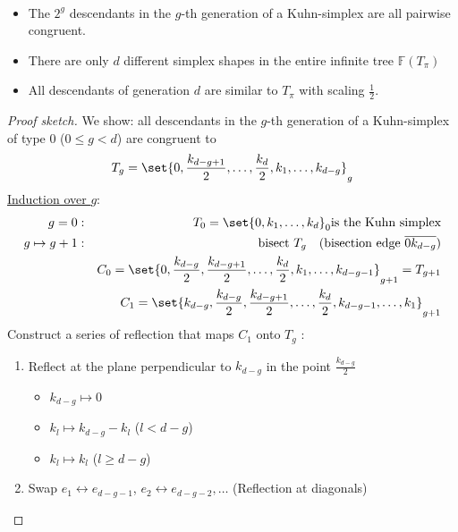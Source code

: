 \begin{theorem}\
	\begin{itemize}
		\item The $2^g$ descendants in the $g$-th generation of a Kuhn-simplex are all pairwise congruent.
		\item There are only $d$ different simplex shapes in the entire infinite tree $\mathbb{F}(T_{\pi})$
		\item All descendants of generation $d$ are similar to $T_{\pi}$ with scaling $\frac{1}{2}$.
			
	\end{itemize}
\end{theorem}
\begin{proof}[Proof sketch]
	We show: all descendants in the $g$-th generation of a Kuhn-simplex of type $0$ ($0 \leq g < d$) are congruent to
	\begin{equation*}
    T_{g}= \set{0, \frac{k_{d-g+1}}{2},\dots ,\frac{k_{d}}{2},k_{1},\dots ,k_{d-g} }_{g}
	\end{equation*}
	\underline{Induction over $g$}:
	\begin{align*}
		g=0&: & T_{0}= \set{0,k_{1},\dots ,k_{d} }_{0} \text{is the Kuhn simplex}\\
		g\mapsto g+1&: &\text{bisect } T_{g}\quad ( \text{bisection edge } \overline{0k_{d-g}})\\
		 && C_{0}= \set{ 0, \frac{k_{d-g}}{2},\frac{k_{d-g+1}}{2},\dots , \frac{k_{d}}{2},k_{1},\dots ,k_{d-g-1}}_{g+1}= T_{g+1}\\
     && C_{1}= \set{ k_{d-g}, \frac{k_{d-g}}{2},\frac{k_{d-g+1}}{2},\dots , \frac{k_{d}}{2},k_{d-g-1},\dots ,k_{1} }_{g+1} %
	\end{align*}
	Construct a series of reflection that maps $C_{1}$ onto $T_{g}$ :
	\begin{enumerate}
		\item Reflect at the plane perpendicular to $k_{d-g}$ in the point $\frac{k_{d-g}}{2}$
			\begin{itemize}
				\item $k_{d-g} \mapsto 0$
				\item $k_{l} \mapsto k_{d-g}-k_{l}$ ($l < d-g$)
				\item $k_{l} \mapsto k_{l}$ ($l \geq d-g$)
			\end{itemize}
    \item Swap $e_{1}\leftrightarrow e_{d-g-1}$, $e_{2} \leftrightarrow e_{d-g-2},\dots $ (Reflection at diagonals)

\end{enumerate}
\end{proof}
